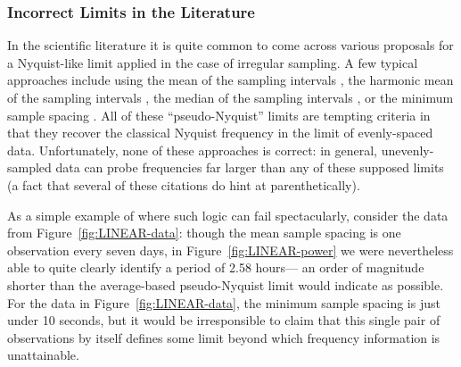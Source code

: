 \documentclass[preprint]{aastex}
\newcommand{\fig}[1]{Figure~\ref{fig:#1}}
\begin{document}
\subsubsection{Incorrect Limits in the Literature}

In the scientific literature it is quite common to come across various proposals
for a Nyquist-like limit applied in the case of irregular sampling.
A few typical approaches include using the mean of the sampling intervals
\citep[e.g.][]{Scargle82, Horne86, NumRec},
the harmonic mean of the sampling intervals \citep[e.g.][]{Debosscher07},
the median of the sampling intervals \citep[e.g.][]{Graham2013b},
or the minimum sample spacing \citep[e.g.][]{Percy86, Roberts87, Press89, Hilditch01}.
All of these ``pseudo-Nyquist'' limits are tempting criteria in that
they recover the classical Nyquist
frequency in the limit of evenly-spaced data.
Unfortunately, none of these approaches is correct: in general,
unevenly-sampled data can probe frequencies far larger than any of these
supposed limits (a fact that several of these citations do hint at
parenthetically).

As a simple example of where such logic can fail spectacularly,
consider the data from \fig{LINEAR-data}: though the mean sample
spacing is one observation every seven days, in \fig{LINEAR-power}
we were nevertheless able to quite clearly identify a period of 2.58 hours---
an order of magnitude shorter than the average-based pseudo-Nyquist limit
would indicate as possible.
For the data in \fig{LINEAR-data}, the minimum sample spacing is just under 10
seconds, but it would be irresponsible to claim that this single pair of
observations by itself defines some limit beyond which frequency information
is unattainable.
\end{document}
